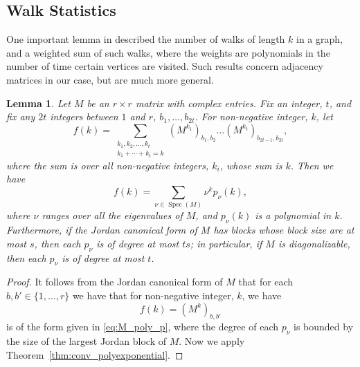\documentclass{memo-l}
\theoremstyle{plain}
\newtheorem{lemma}[theorem]{Lemma}
\theoremstyle{definition}
\numberwithin{section}{chapter}
\numberwithin{equation}{chapter}
\DeclareMathOperator{\Spec}{Spec}
\theoremstyle{plain}
\theoremstyle{definition}
\begin{document}
\subsection{Walk Statistics}

One important lemma in \cite{friedman_random_graphs,friedman_alon}
described the number of walks of length $k$ in a graph, and a weighted
sum of such walks, where the weights are polynomials in the number of
time certain vertices are visited.  Such results concern adjacency
matrices in our case, but are much more general.

\begin{lemma}\label{le:matrix_entry_sum}
Let $M$ be an $r\times r$ matrix with complex entries.  Fix an integer,
$t$, and fix any $2t$ integers between $1$ and $r$,
$b_1,\ldots,b_{2t}$.
For non-negative integer, $k$, let
$$
f(k) = \sum_{\substack{k_1,k_2,\ldots,k_t \\ k_1+\cdots+k_t=k}}
(M^{k_1})_{b_1,b_2} \ldots
(M^{k_t})_{b_{2t-1},b_{2t}},
$$
where the sum is over all non-negative integers, $k_i$, whose sum is $k$.
Then we have
\begin{equation}\label{eq:M_poly_p}
f(k) = \sum_{\nu\in\Spec(M)} \nu^k p_\nu(k),
\end{equation}
where $\nu$ ranges over all the eigenvalues of $M$, and 
$p_\nu(k)$ is a polynomial in $k$.
Furthermore, if the Jordan canonical form of $M$ has blocks whose 
block size
are at most $s$, then each $p_\nu$ is of degree at most $ts$;
in particular, if $M$ is diagonalizable, then each $p_\nu$ is of
degree at most $t$.
\end{lemma}
\begin{proof}
It follows from the Jordan canonical form of $M$ that for each
$b,b'\in\{1,\ldots,r\}$ we have that for non-negative integer, $k$, we have
$$
f(k) = (M^k)_{b,b'}
$$
is of the form given in \eqref{eq:M_poly_p}, where the degree of each
$p_\nu$
is bounded by the size of the largest Jordan block of $M$.
Now we apply 
Theorem~\ref{thm:conv_polyexponential}.
\end{proof}
\end{document}
